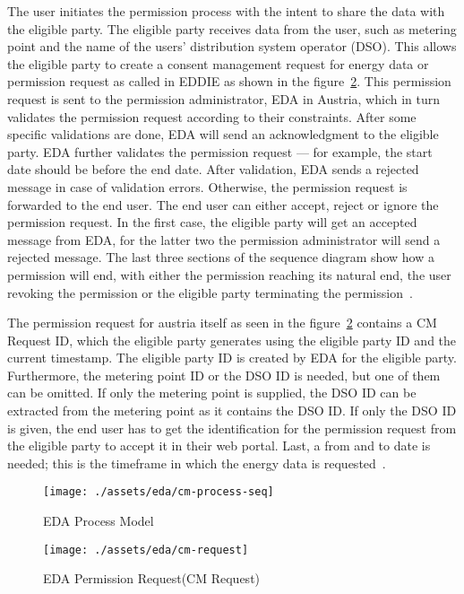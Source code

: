 The user initiates the permission process with the intent to share the data with the eligible party.
The eligible party receives data from the user, such as metering point and the name of the users' distribution system operator (DSO).
This allows the eligible party to create a consent management request for energy data or permission request as called in EDDIE as shown in the figure\ \ref{fig:eda-permission-request}.
This permission request is sent to the permission administrator, EDA in Austria, which in turn validates the permission request according to their constraints.
After some specific validations are done, EDA will send an acknowledgment to the eligible party.
EDA further validates the permission request — for example, the start date should be before the end date.
After validation, EDA sends a rejected message in case of validation errors.
Otherwise, the permission request is forwarded to the end user.
The end user can either accept, reject or ignore the permission request.
In the first case, the eligible party will get an accepted message from EDA, for the latter two the permission administrator will send a rejected message.
The last three sections of the sequence diagram show how a permission will end, with either the permission reaching its natural end, the user revoking the permission or the eligible party terminating the permission~\cite{eda, ebutilities}.

The permission request for austria itself as seen in the figure\ \ref{fig:eda-permission-request} contains a CM Request ID, which the eligible party generates using the eligible party ID and the current timestamp.
The eligible party ID is created by EDA for the eligible party.
Furthermore, the metering point ID or the DSO ID is needed, but one of them can be omitted.
If only the metering point is supplied, the DSO ID can be extracted from the metering point as it contains the DSO ID.
If only the DSO ID is given, the end user has to get the identification for the permission request from the eligible party to accept it in their web portal.
Last, a from and to date is needed; this is the timeframe in which the energy data is requested~\cite{ebutilities}.

\begin{figure}[h]
    \texttt{[image: ./assets/eda/cm-process-seq]}
    \caption{EDA Process Model}
    \label{fig:eda-process-model}
\end{figure}

\begin{figure}[h]
    \texttt{[image: ./assets/eda/cm-request]}
    \caption{EDA Permission Request(CM Request)}
    \label{fig:eda-permission-request}
\end{figure}

